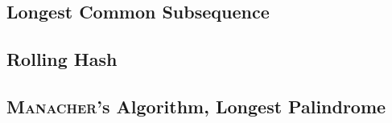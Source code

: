 \subsection{Longest Common Subsequence}


\subsection{Rolling Hash}


\subsection{\textsc{Manacher}'s Algorithm, Longest Palindrome}

